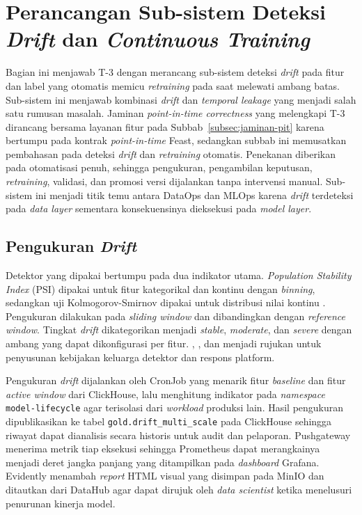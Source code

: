 \section{Perancangan Sub-sistem Deteksi \textit{Drift} dan \textit{Continuous Training}}
\label{sec:drift-ct}

Bagian ini menjawab T-3 dengan merancang sub-sistem deteksi \textit{drift} pada fitur dan label yang otomatis memicu \textit{retraining} pada saat melewati ambang batas. Sub-sistem ini menjawab kombinasi \textit{drift} dan \textit{temporal leakage} yang menjadi salah satu rumusan masalah. Jaminan \textit{point-in-time correctness} yang melengkapi T-3 dirancang bersama layanan fitur pada Subbab~\ref{subsec:jaminan-pit} karena bertumpu pada kontrak \textit{point-in-time} Feast, sedangkan subbab ini memusatkan pembahasan pada deteksi \textit{drift} dan \textit{retraining} otomatis. Penekanan diberikan pada otomatisasi penuh, sehingga pengukuran, pengambilan keputusan, \textit{retraining}, validasi, dan promosi versi dijalankan tanpa intervensi manual. Sub-sistem ini menjadi titik temu antara DataOps dan MLOps karena \textit{drift} terdeteksi pada \textit{data layer} sementara konsekuensinya dieksekusi pada \textit{model layer}.

\subsection{Pengukuran \textit{Drift}}
\label{subsec:pengukuran-drift}

Detektor yang dipakai bertumpu pada dua indikator utama. \textit{Population Stability Index} (PSI) dipakai untuk fitur kategorikal dan kontinu dengan \textit{binning}, sedangkan uji Kolmogorov-Smirnov dipakai untuk distribusi nilai kontinu \autocite{reis2016kdd}. Pengukuran dilakukan pada \textit{sliding window} dan dibandingkan dengan \textit{reference window}. Tingkat \textit{drift} dikategorikan menjadi \textit{stable}, \textit{moderate}, dan \textit{severe} dengan ambang yang dapat dikonfigurasi per fitur. \textcite{bayram2022concept}, \textcite{lu2019learning}, dan \textcite{hinder2023model} menjadi rujukan untuk penyusunan kebijakan keluarga detektor dan respons platform.

Pengukuran \textit{drift} dijalankan oleh CronJob yang menarik fitur \textit{baseline} dan fitur \textit{active window} dari ClickHouse, lalu menghitung indikator pada \textit{namespace} \texttt{model-lifecycle} agar terisolasi dari \textit{workload} produksi lain. Hasil pengukuran dipublikasikan ke tabel \texttt{gold.drift\_multi\_scale} pada ClickHouse sehingga riwayat dapat dianalisis secara historis untuk audit dan pelaporan. Pushgateway menerima metrik tiap eksekusi sehingga Prometheus dapat merangkainya menjadi deret jangka panjang yang ditampilkan pada \textit{dashboard} Grafana. Evidently menambah \textit{report} HTML visual yang disimpan pada MinIO dan ditautkan dari DataHub agar dapat dirujuk oleh \textit{data scientist} ketika menelusuri penurunan kinerja model.

